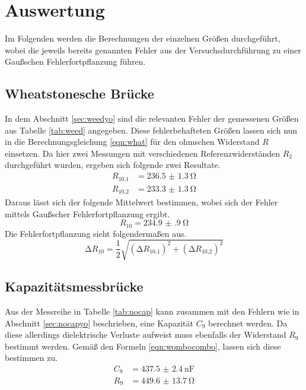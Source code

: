 \section{Auswertung}
Im Folgenden werden die Berechnungen der einzelnen Größen durchgeführt, wobei die jeweils bereits genannten Fehler aus der Versuchsdurchführung zu einer
Gaußschen Fehlerfortpflanzung führen. 

\subsection{Wheatstonesche Brücke}
In dem Abschnitt \ref{sec:weedyo} sind die relevanten Fehler der gemessenen Größen aus Tabelle \ref{tab:weed} angegeben. Diese fehlerbehafteten Größen lassen sich nun in die Berechnungsgleichung \eqref{eqn:what}
für den ohmschen Widerstand $R$ einsetzen.
Da hier zwei Messungen mit verschiedenen Referenzwiderständen $R_{2}$ durchgeführt wurden, ergeben sich folgende zwei Resultate.
\begin{align*}
R_{10\text{,}1} &= \SI{236.5(13)}{\ohm} \\
R_{10\text{,}2} &= \SI{233.3(13)}{\ohm} 
\end{align*}
Daraus lässt sich der folgende Mittelwert bestimmen, wobei sich der Fehler mittels Gaußscher Fehlerfortpflanzung ergibt.
\begin{equation*}
R_{10} = \SI{234.9(9)}{\ohm}
\end{equation*}
Die Fehlerfortpflanzung sieht folgendermaßen aus.
\begin{equation*}
\increment R_{10} = \frac{1}{2} \sqrt{(\increment R_{10\text{,}1})^{2} + (\increment R_{10\text{,}2})^{2} }
\end{equation*}



\subsection{Kapazitätsmessbrücke}
Aus der Messreihe in Tabelle \ref{tab:nocap} kann zusammen mit den Fehlern wie in Abschnitt \ref{sec:nocapyo} beschrieben, eine Kapazität $C_{9}$ berechnet werden. Da diese allerdings dielektrische Verluste 
aufweist muss ebenfalls der Widerstand $R_{9}$ bestimmt werden. Gemäß den Formeln \eqref{eqn:wombocombo}, lassen sich diese bestimmen zu.
\begin{align*}
C_{9} &= \SI{437.5(24)}{\nano\farad} \\
R_{9} &= \SI{449.6(137)}{\ohm} 
\end{align*}

